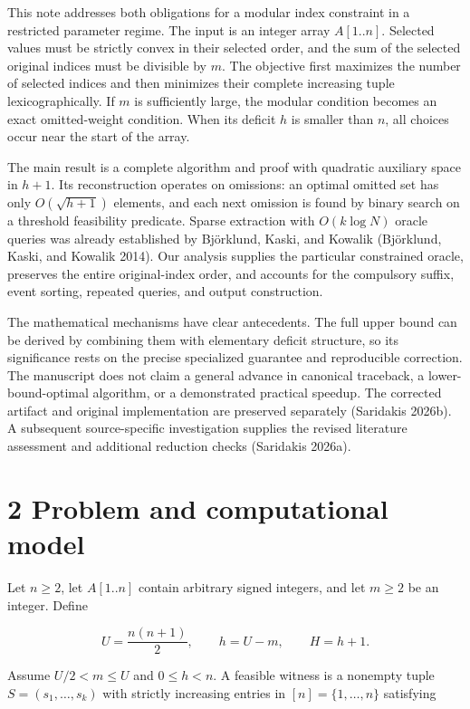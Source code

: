\documentclass[
  11pt,
  letterpaper,
]{article}
\begin{document}
This note addresses both obligations for a modular index constraint in a
restricted parameter regime. The input is an integer array \(A[1..n]\).
Selected values must be strictly convex in their selected order, and the
sum of the selected original indices must be divisible by \(m\). The
objective first maximizes the number of selected indices and then
minimizes their complete increasing tuple lexicographically. If \(m\) is
sufficiently large, the modular condition becomes an exact
omitted-weight condition. When its deficit \(h\) is smaller than \(n\),
all choices occur near the start of the array.

The main result is a complete algorithm and proof with quadratic
auxiliary space in \(h+1\). Its reconstruction operates on omissions: an
optimal omitted set has only \(O(\sqrt{h+1})\) elements, and each next
omission is found by binary search on a threshold feasibility predicate.
Sparse extraction with \(O(k\log N)\) oracle queries was already
established by Björklund, Kaski, and Kowalik (Björklund, Kaski, and
Kowalik 2014). Our analysis supplies the particular constrained oracle,
preserves the entire original-index order, and accounts for the
compulsory suffix, event sorting, repeated queries, and output
construction.

The mathematical mechanisms have clear antecedents. The full upper bound
can be derived by combining them with elementary deficit structure, so
its significance rests on the precise specialized guarantee and
reproducible correction. The manuscript does not claim a general advance
in canonical traceback, a lower-bound-optimal algorithm, or a
demonstrated practical speedup. The corrected artifact and original
implementation are preserved separately (Saridakis 2026b). A subsequent
source-specific investigation supplies the revised literature assessment
and additional reduction checks (Saridakis 2026a).

\hypertarget{problem-and-computational-model}{%
\section{2 Problem and computational
model}\label{problem-and-computational-model}}

Let \(n\geq2\), let \(A[1..n]\) contain arbitrary signed integers, and
let \(m\geq2\) be an integer. Define

\[U=\frac{n(n+1)}2,\qquad h=U-m,\qquad H=h+1.\]

Assume \(U/2<m\leq U\) and \(0\leq h<n\). A feasible witness is a
nonempty tuple \(S=(s_1,\ldots,s_k)\) with strictly increasing entries
in \([n]=\{1,\ldots,n\}\) satisfying
\end{document}
